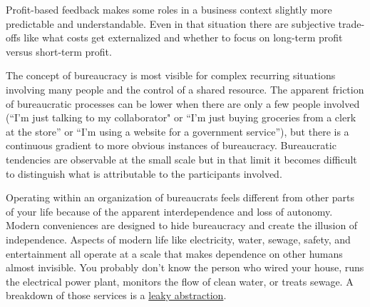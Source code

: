 
Profit-based feedback makes some roles in a business context slightly more predictable and understandable. Even in that situation there are subjective trade-offs like what costs get externalized and whether to focus on long-term profit versus short-term profit. 

The concept of bureaucracy is most visible for complex recurring situations involving many people and the control of a shared resource. The apparent friction of bureaucratic processes can be lower when there are only a few people involved (``I'm just talking to my collaborator" or ``I'm just buying groceries from a clerk at the store'' or ``I'm using a website for a government service''), but there is a continuous gradient to more obvious instances of bureaucracy. Bureaucratic tendencies are observable at the small scale but in that limit it becomes difficult to distinguish what is attributable to the participants involved.

Operating within an organization of bureaucrats feels different from other parts of your life because of the apparent interdependence and loss of autonomy. 
Modern conveniences are designed to hide bureaucracy and create the illusion of independence.
Aspects of modern life like electricity, water, sewage, safety, and entertainment all operate at a scale that makes dependence on other humans almost invisible. You probably don't know the person who wired your house, runs the electrical power plant, monitors the flow of clean water, or treats sewage. A breakdown of those services is a 
\href{https://en.wikipedia.org/wiki/Leaky_abstraction}{leaky abstraction}.

\ \\

